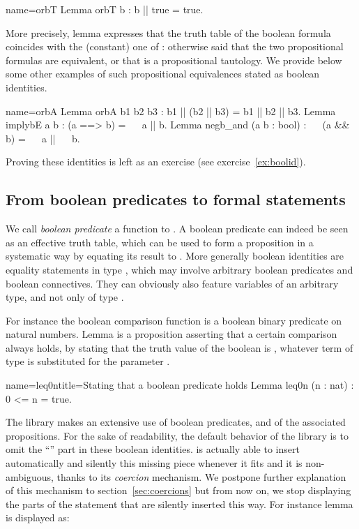 \begin{coq}{name=orbT}{}
Lemma orbT b : b || true = true.
\end{coq}

More precisely, lemma 
expresses that the truth table of the boolean formula 
coincides with the (constant) one of : otherwise said that the
two propositional formulas are equivalent, or that  is a
propositional tautology. We provide below some other examples of such
propositional equivalences stated as boolean identities.

\begin{coq}{name=orbA}{}
Lemma orbA b1 b2 b3 : b1 || (b2 || b3) = b1 || b2 || b3.
Lemma implybE a b : (a ==> b) = ~~ a || b.
Lemma negb_and (a b : bool) : ~~ (a && b) = ~~ a || ~~ b.
\end{coq}
Proving these identities is left as an exercise (see
exercise~\ref{ex:boolid}).


\subsection{From boolean predicates to formal statements}
\label{sec:bstatements}

We call \emph{boolean predicate} a function to . A boolean
predicate can indeed be seen as an effective truth table, which can be
used to form a proposition in a systematic way by equating its result
to . More generally boolean identities are equality statements
in type , which may involve arbitrary boolean predicates and boolean
connectives. They can obviously also feature variables of an arbitrary
type, and not only of type .

For instance the boolean comparison function
 is a boolean binary predicate on
natural numbers. Lemma  is a proposition asserting that a
certain comparison always holds, by stating that the truth value of
the boolean  is , whatever term  of type 
is substituted for the parameter .

\begin{coq}{name=leq0n}{title=Stating that a boolean predicate holds}
Lemma leq0n (n : nat) : 0 <= n = true.
\end{coq}

The \mcbMC{} library makes an extensive use of boolean predicates, and
of the associated propositions. For the sake of readability, the
default behavior of the  \mcbMC{} library is to omit the ``''
part in these boolean identities. \Coq{} is actually able to insert
automatically and silently this missing piece whenever it fits and
it is non-ambiguous, thanks to its \emph{coercion} mechanism. We
postpone further explanation of this mechanism to
section~\ref{sec:coercions} but from now on, we stop displaying the
 parts of the statement that are silently inserted this
way. For instance lemma  is displayed as:

